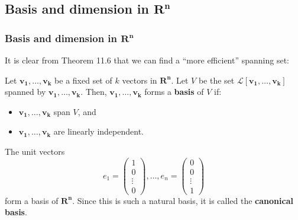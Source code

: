 \documentclass[10pt, handout]{beamer}
\begin{document}
\subsection{Basis and dimension in $\mathbf{R^n}$}

\begin{frame}
\frametitle{Basis and dimension in $\mathbf{R^n}$} \vskip 0.1in

It is clear from Theorem 11.6 that we can find a ``more efficient'' spanning set:

\begin{definition}
Let $\mathbf{v_1}, \ldots , \mathbf{v_k}$ be a fixed set of $k$ vectors in $\mathbf{R^n}$. Let $V$ be the set $\mathcal{L}[\mathbf{v_1}, \ldots , \mathbf{v_k}]$ spanned by $\mathbf{v_1}, \ldots , \mathbf{v_k}$. Then, $\mathbf{v_1}, \ldots , \mathbf{v_k}$ forms a \textbf{basis} of $V$ if:
\begin{itemize}
\item[(a)] $\mathbf{v_1}, \ldots , \mathbf{v_k}$ span $V$, and
\item[(b)] $\mathbf{v_1}, \ldots , \mathbf{v_k}$ are linearly independent.
\end{itemize} 
\end{definition}


\begin{example}[11.8]
 The unit vectors $$e_1 = \begin{pmatrix} 1 \\ 0 \\ \vdots \\ 0 \end{pmatrix} , \ldots , e_n = \begin{pmatrix} 0 \\ 0 \\ \vdots \\ 1 \end{pmatrix} $$ form a basis of $\mathbf{R^n}$. Since this is such a natural basis, it is called the \textbf{canonical basis}.
\end{example}

\end{frame}
\end{document}
